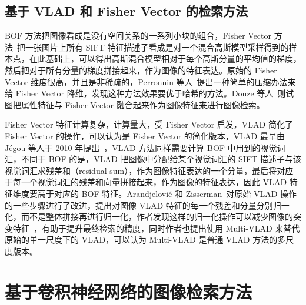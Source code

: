\subsection{基于 VLAD 和 Fisher Vector 的检索方法}
BOF 方法把图像看成是没有空间关系的一系列小块的组合，Fisher Vector 方法~\cite{Perronnin2007FisherKO}把一张图片上所有 SIFT 特征描述子看成是对一个混合高斯模型采样得到的样本点，在此基础上，可以得出高斯混合模型相对于每个高斯分量的平均值的梯度，然后把对于所有分量的梯度拼接起来，作为图像的特征表达。原始的 Fisher Vector 维度很高，并且是非稀疏的，Perronnin 等人~\cite{Perronnin2010LargescaleIR}提出一种简单的压缩办法来给 Fisher Vector 降维，发现这种方法效果要优于哈希的方法。Douze 等人~\cite{Douze2011CombiningAA}则试图把属性特征与 Fisher Vector 融合起来作为图像特征来进行图像检索。

Fisher Vector 特征计算复杂，计算量大，受 Fisher Vector 启发，VLAD 简化了 Fisher Vector 的操作，可以认为是 Fisher Vector 的简化版本，VLAD 最早由 J{\'e}gou 等人于 2010 年提出~\cite{Jgou2010AggregatingLD}，VLAD 方法同样需要计算 BOF 中用到的视觉词汇，不同于 BOF 的是，VLAD 把图像中分配给某个视觉词汇的 SIFT 描述子与该视觉词汇求残差和（residual sum），作为图像特征表达的一个分量，最后将对应于每一个视觉词汇的残差和向量拼接起来，作为图像的特征表达，因此 VLAD 特征维度要高于对应的 BOF 特征。Arandjelovi{\'c} 和 Zisserman~\cite{Arandjelovic2013AllAV}对原始 VLAD 操作的一些步骤进行了改进，提出对图像 VLAD 特征的每一个残差和分量分别归一化，而不是整体拼接再进行归一化，作者发现这样的归一化操作可以减少图像的突变特征~\cite{Jgou2009OnTB}，有助于提升最终检索的精度，同时作者也提出使用 Multi-VLAD 来替代原始的单一尺度下的 VLAD，可以认为 Multi-VLAD 是普通 VLAD 方法的多尺度版本。

\section{基于卷积神经网络的图像检索方法}\label{sec:review_cnn_image_retrieval}
